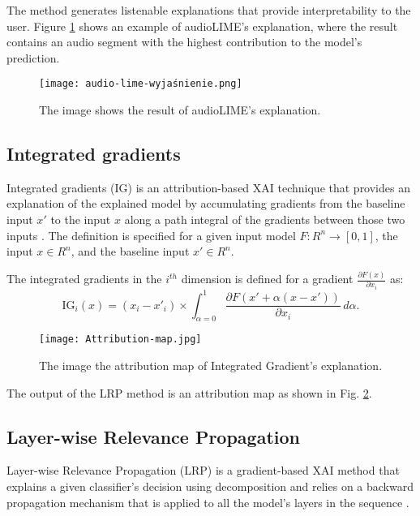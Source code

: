 \documentclass[
    bindingoffset=5mm,  %
    footnoteindent=3mm, %
    hyphenation=true    %
]{src/wut-thesis}
\begin{document}
The method generates listenable explanations that
provide interpretability to the user. Figure \ref{fig:audio-lime-wyjaśnienie} shows an example of
audioLIME’s explanation, where the result contains an audio segment with the highest contribution
to the model’s prediction.

\begin{figure}[h!] %
    \centering
    \texttt{[image: audio-lime-wyjaśnienie.png]}
    \caption{The image shows the result of audioLIME's explanation.}
    \label{fig:audio-lime-wyjaśnienie}
\end{figure}

\subsection{Integrated gradients} \label{ch2:IgradMethod}

Integrated gradients (IG) is an attribution-based XAI technique that provides an explanation
of the explained model by accumulating gradients from the baseline input $x'$ to the input $x$
along a path integral of the gradients between those two inputs \cite{Sundararajan2017-zy}.
The definition is specified for a given input model $F : R^n \rightarrow [0,1]$,
the input $x \in R^n$, and the baseline input $x' \in R^n$.

The integrated gradients in the $i^{th}$ dimension is defined for
a gradient $\frac{\partial F\left(x\right)}{\partial x_i}$ as:
\[
\text{IG}_i(x) = (x_i - x'_i) \times \int_{\alpha=0}^{1} \frac{\partial F\left(x' + \alpha(x - x')\right)}{\partial x_i} \, d\alpha.
\]

\begin{figure}[h!] %
    \centering
    \texttt{[image: Attribution-map.jpg]}
    \caption{The image the attribution map of Integrated Gradient's explanation.}
    \label{fig:IgAttributionMap}
\end{figure}

The output of the LRP method is an attribution map as shown in Fig. \ref{fig:IgAttributionMap}.

\subsection{Layer-wise Relevance Propagation} \label{ch2:LrpMethod}
Layer-wise Relevance Propagation (LRP) is a gradient-based XAI method that
explains a given classifier’s decision using decomposition and relies on a backward propagation
mechanism that is applied to all the model’s layers in the sequence \cite{Binder2016-oa}.
\end{document}
